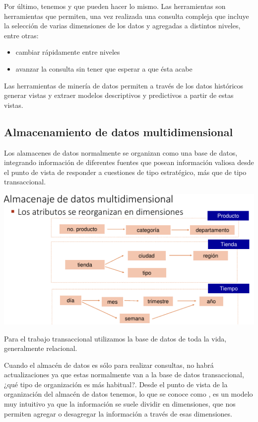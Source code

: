 Por último, tenemos  y  que pueden hacer lo mismo. Las herramientas  son herramientas que permiten, una vez realizada una consulta compleja que incluye la selección de varias dimensiones de los datos y agregadas a distintos niveles, entre otras:
\begin{itemize}
    \item cambiar rápidamente entre niveles
    \item avanzar la consulta sin tener que esperar a que ésta acabe
\end{itemize} 

Las herramientas de minería de datos permiten a través de los datos históricos generar vistas  y extraer modelos descriptivos y predictivos a partir de estas vistas.

\subsection{Almacenamiento de datos multidimensional}

Los alamacenes de datos normalmente se organizan como una base de datos, integrando información de diferentes fuentes que posean información valiosa desde el punto de vista de responder a cuestiones de tipo estratégico, más que de tipo transaccional.

\begin{center}
    \includegraphics[scale=.8]{images/mod01-09.png}
\end{center}

Para el trabajo transaccional utilizamos la base de datos de toda la vida, generalmente relacional.

Cuando el almacén de datos es sólo para realizar consultas, no habrá actualizaciones ya que estas normalmente van a la base de datos transaccional, ¿qué tipo de organización es más habitual?. Desde el punto de vista de la organización del almacén de datos tenemos, lo que se conoce como , es un modelo muy intuitivo ya que la información se suele dividir en dimensiones, que nos permiten agregar o desagregar la información a través de esas dimensiones.

